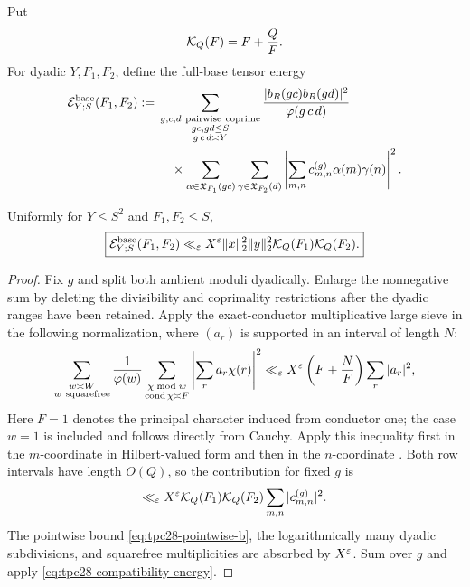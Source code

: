 Put
\begin{equation}
 \mathcal K_Q(F)=F+\frac QF.
 \label{eq:tpc28-KQ}
\end{equation}
For dyadic $Y,F_1,F_2$, define the full-base tensor energy
\begin{align}
 \mathcal E^{\rm base}_{Y;S}(F_1,F_2)
 :={}&\sum_{\substack{g,c,d\ \mathrm{pairwise\ coprime}\\
 gc,gd\le S\\g\,c\,d\asymp Y}}
 \frac{|b_R(gc)b_R(gd)|^2}{\varphi(g\,c\,d)}
 \notag\\
 &\quad\times
 \sum_{\alpha\in\mathfrak X_{F_1}(gc)}
 \sum_{\gamma\in\mathfrak X_{F_2}(d)}
 \left|\sum_{m,n}c_{m,n}^{(g)}
 \alpha(m)\gamma(n)\right|^2.
 \label{eq:tpc28-base-energy}
\end{align}

\begin{theorem}
\label{thm:tpc28-base-energy}
Uniformly for $Y\le S^2$ and $F_1,F_2\le S$,
\begin{equation}
 \boxed{
 \mathcal E^{\rm base}_{Y;S}(F_1,F_2)
 \ll_\varepsilon X^\varepsilon\|x\|_2^2\|y\|_2^2
 \mathcal K_Q(F_1)\mathcal K_Q(F_2).}
 \label{eq:tpc28-base-energy-bound}
\end{equation}
\end{theorem}

\begin{proof}
Fix $g$ and split both ambient moduli dyadically.  Enlarge the
nonnegative sum by deleting the divisibility and coprimality
restrictions after the dyadic ranges have been retained.  Apply the
exact-conductor multiplicative large sieve in the following
normalization, where $(a_r)$ is supported in an interval of length
$N$:
\begin{equation}
 \sum_{\substack{w\asymp W\\w\ {\rm squarefree}}}
 \frac1{\varphi(w)}
 \sum_{\substack{\chi\bmod w\\\operatorname{cond}\chi\asymp F}}
 \left|\sum_ra_r\chi(r)\right|^2
 \ll_\varepsilon X^\varepsilon\left(F+\frac NF\right)
 \sum_r|a_r|^2,
 \label{eq:tpc28-exact-conductor-LS}
\end{equation}
Here $F=1$ denotes the principal character induced from conductor
one; the case $w=1$ is included and follows directly from Cauchy.
Apply this inequality first in the $m$-coordinate in Hilbert-valued
form and then in the
$n$-coordinate \citep{IwaniecKowalski2004,WangTPC22,WangTPC26}.
Both row intervals have length $O(Q)$, so the contribution for fixed
$g$ is
\[
 \ll_\varepsilon X^\varepsilon\mathcal K_Q(F_1)\mathcal K_Q(F_2)
 \sum_{m,n}|c_{m,n}^{(g)}|^2.
\]
The pointwise bound \eqref{eq:tpc28-pointwise-b}, the logarithmically
many dyadic subdivisions, and squarefree multiplicities are absorbed
by $X^\varepsilon$.  Sum over $g$ and apply
\eqref{eq:tpc28-compatibility-energy}.
\end{proof}

